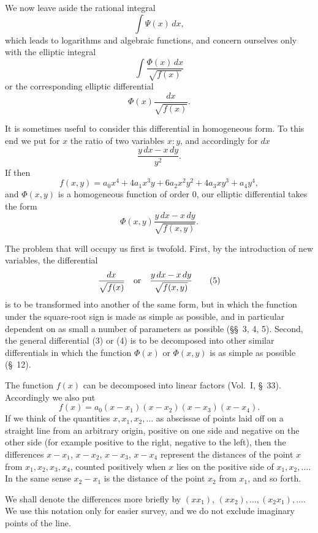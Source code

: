 \documentclass[11pt]{article}
\begin{document}
We now leave aside the rational integral
\[
\int \Psi(x)\,dx,
\]
which leads to logarithms and algebraic functions, and concern ourselves only with the elliptic integral
\begin{equation}
\int \frac{\Phi(x)\,dx}{\sqrt{f(x)}}
\tag{2}
\end{equation}
or the corresponding elliptic differential
\begin{equation}
\Phi(x)\frac{dx}{\sqrt{f(x)}}.
\tag{3}
\end{equation}

It is sometimes useful to consider this differential in homogeneous form. To this end we put for $x$ the ratio of two variables $x:y$, and accordingly for $dx$
\[
\frac{y\,dx-x\,dy}{y^2}.
\]
If then
\[
f(x,y)=a_0x^4+4a_1x^3y+6a_2x^2y^2+4a_3xy^3+a_4y^4,
\]
and $\Phi(x,y)$ is a homogeneous function of order $0$, our elliptic differential takes the form
\begin{equation}
\Phi(x,y)\frac{y\,dx-x\,dy}{\sqrt{f(x,y)}}.
\tag{4}
\end{equation}

The problem that will occupy us first is twofold. First, by the introduction of new variables, the differential
\begin{equation}
\frac{dx}{\sqrt{f(x)}}\quad\hbox{or}\quad \frac{y\,dx-x\,dy}{\sqrt{f(x,y)}}
\tag{5}
\end{equation}
is to be transformed into another of the same form, but in which the function under the square-root sign is made as simple as possible, and in particular dependent on as small a number of parameters as possible (\S\S~3, 4, 5). Second, the general differential (3) or (4) is to be decomposed into other similar differentials in which the function $\Phi(x)$ or $\Phi(x,y)$ is as simple as possible (\S~12).

The function $f(x)$ can be decomposed into linear factors (Vol.~I, \S~33). Accordingly we also put
\[
f(x)=a_0(x-x_1)(x-x_2)(x-x_3)(x-x_4).
\]
If we think of the quantities $x,x_1,x_2,\ldots$ as abscissae of points laid off on a straight line from an arbitrary origin, positive on one side and negative on the other side (for example positive to the right, negative to the left), then the differences $x-x_1$, $x-x_2$, $x-x_3$, $x-x_4$ represent the distances of the point $x$ from $x_1,x_2,x_3,x_4$, counted positively when $x$ lies on the positive side of $x_1,x_2,\ldots$. In the same sense $x_2-x_1$ is the distance of the point $x_2$ from $x_1$, and so forth.

We shall denote the differences more briefly by $(xx_1)$, $(xx_2),\ldots,(x_2x_1),\ldots$. We use this notation only for easier survey, and we do not exclude imaginary points of the line.
\end{document}
